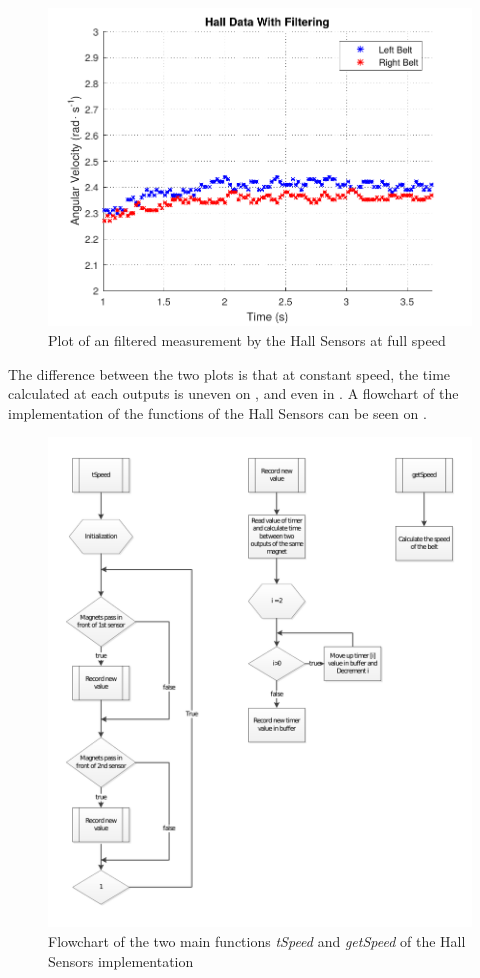 \begin{figure}[H]
	\centering
	\includegraphics[scale=0.9]{figures/filteredHall.pdf}
	\caption{Plot of an filtered measurement by the Hall Sensors at full speed}
	\label{filteredHall}
\end{figure}

The difference between the two plots is that at constant speed, the time calculated at each outputs is uneven on , and even in . A flowchart of the implementation of the functions of the Hall Sensors can be seen on .

\begin{figure}[H]
	\centering
	\includegraphics[scale=0.9]{figures/hallFlowchart.pdf}
	\caption{Flowchart of the two main functions \textit{tSpeed} and \textit{getSpeed} of the Hall Sensors implementation}
	\label{hallFlowchart}
\end{figure}

